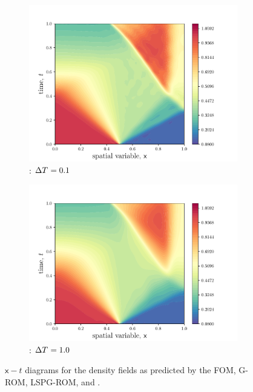 \begin{figure}
\begin{center}
\begin{subfigure}[t]{0.48\textwidth}
\includegraphics[width=1.\linewidth]{figs/sod/xt_w50.pdf}
\caption{\methodAcronym: $\Delta T^{} = 0.1$}
\end{subfigure}
\begin{subfigure}[t]{0.48\textwidth}
\includegraphics[width=1.\linewidth]{figs/sod/xt_w500.pdf}
\caption{\methodAcronym: $\Delta T^{} = 1.0$}
\end{subfigure}
\caption{$\mathsf{x}-t$ diagrams for the density fields as predicted by the FOM, G-ROM,
	LSPG-ROM, and \methodAcronymROMs.}
\label{fig:sod_xt}
\end{center}
\end{figure}

